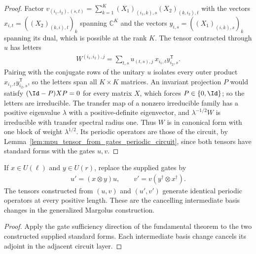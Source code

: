 \begin{proof}
    \leanok
    Factor $v_{(i_1,i_2),(s,t)}=\sum_{k=1}^K(X_1)_{(i_1,k),s}(X_2)_{(k,i_2),t}$
    with the vectors $x_{i,t}=((X_2)_{(k,i),t})_k$ spanning $\mathbb C^K$ and the
    vectors $y_{i,s}=((X_1)_{(i,k),s})_k$ spanning its dual, which is possible at
    the rank $K$. The tensor contracted through $u$ has letters
    \begin{align}
        W^{(i_1,i_2),j}=\sum_{t,s}u_{(t,s),j}\,x_{i_1,t}y_{i_2,s}^{\mathsf T}.
    \end{align}
    Pairing with the conjugate rows of the unitary $u$ isolates every outer
    product $x_{i_1,t}y_{i_2,s}^{\mathsf T}$, so the letters span all
    $K\times K$ matrices. An invariant projection $P$ would satisfy
    $(\Id-P)XP=0$ for every matrix $X$, which forces $P\in\{0,\Id\}$; so the
    letters are irreducible. The transfer map of a nonzero irreducible family has
    a positive eigenvalue $\lambda$ with a positive-definite eigenvector, and
    $\lambda^{-1/2}W$ is irreducible with transfer spectral radius one. Thus $W$
    is in canonical form with one block of weight $\lambda^{1/2}$. Its periodic
    operators are those of the circuit, by
    Lemma~\ref{lem:mpu_tensor_from_gates_periodic_circuit}, since both tensors
    have standard forms with the gates $u,v$.
\end{proof}

\begin{lemma}
    \label{lem:mpu_tensor_from_gates_basis_freedom}
    \leanok
    If $x\in U(\ell)$ and $y\in U(r)$, replace the supplied gates by
    \begin{align}
        u'=(x\otimes y)u,\qquad v'=v(y^\dagger\otimes x^\dagger).
    \end{align}
    The tensors constructed from $(u,v)$ and $(u',v')$ generate identical
    periodic operators at every positive length. These are the cancelling
    intermediate basis changes in the generalized Margolus construction.
\end{lemma}
\begin{proof}
    \leanok
    Apply the gate sufficiency direction of the fundamental theorem to
    the two constructed supplied standard forms. Each intermediate basis
    change cancels its adjoint in the adjacent circuit layer.
\end{proof}

